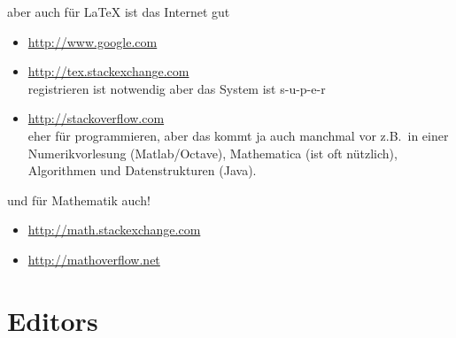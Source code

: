\documentclass{beamer}
\begin{document}
\begin{frame}{aber auch für LaTeX ist das Internet gut}
    \begin{itemize}
        \item \url{http://www.google.com}
        \item \url{http://tex.stackexchange.com}\\
            registrieren ist notwendig aber das System ist s-u-p-e-r
        \item \url{http://stackoverflow.com}\\
            eher für programmieren, aber das kommt ja auch manchmal vor z.B.~in
            einer Numerikvorlesung (Matlab/Octave), Mathematica (ist oft
            nützlich), Algorithmen und Datenstrukturen (Java).
    \end{itemize}
\end{frame}

\begin{frame}{und für Mathematik auch!}
    \begin{itemize}
        \item \url{http://math.stackexchange.com}
        \item \url{http://mathoverflow.net}
    \end{itemize}
\end{frame}

\section{Editors}
\label{sec:editors}
\end{document}
